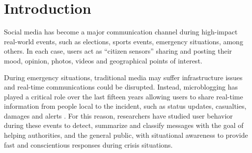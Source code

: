 \documentclass[sigconf]{acmart}
\begin{document}



\maketitle

\section{Introduction}
Social media has become a major communication channel during high-impact real-world events, such as elections, sports events, emergency situations, among others. In each case, users act as ``citizen sensors'' sharing and posting their mood, opinion, photos, videos and geographical points of interest.

During emergency situations, traditional media may suffer infrastructure issues and real-time communications could be disrupted. Instead, microblogging has played a critical role over the last fifteen years allowing users to share real-time information from people local to the incident, such as status updates, casualties, damages and alerts \cite{kumar2011tweettracker,imran2013extracting,stowe2016identifying,reuterfifteen}. For this reason, researchers have studied user behavior during these events to detect, summarize and classify messages with the goal of helping authorities, and the general public, with situational awareness to provide fast and conscientious responses during crisis situations.
\end{document}
